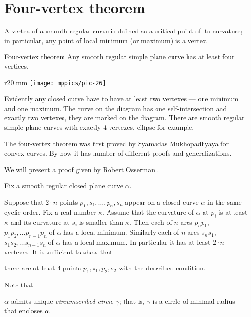 \chapter{Four-vertex theorem}

A vertex of a smooth regular curve is defined as a critical point of its curvature;
in particular, any point of local minimum (or maximum) is a vertex.

\begin{thm}{Four-vertex theorem}
Any smooth regular simple plane curve has at least four
vertices.
\end{thm}

\begin{wrapfigure}{r}{20 mm}
\vskip-4mm
\centering
\texttt{[image: mppics/pic-26]}
\vskip0mm
\end{wrapfigure}

Evidently any closed curve have to have at least two vertexes --- one minimum and one maximum.
The curve on the diagram has one self-intersection and exactly two vertexes, they are marked on the diagram.
There are smooth regular simple plane curves with exactly 4 vertexes, 
ellipse for example.

The four-vertex theorem was first proved by Syamadas Mukhopadhyaya \cite{mukhopadhyaya} for convex curves.
By now it has number of different proofs and generalizations.

We will present a proof given by Robert Osserman \cite{osserman}.

Fix a smooth regular closed plane curve $\alpha$.

Suppose that $2\cdot n$ points $p_1,s_1,\dots,p_n,s_n$ appear on a closed curve $\alpha$ in the same cyclic order.
Fix a real number $\kappa$.
Assume that the curvature of $\alpha$ at $p_i$ is at least $\kappa$ and its curvature at $s_i$ is smaller than $\kappa$.
Then each of $n$ arcs $p_{n}p_1$, $p_{1}p_2, \dots p_{n-1}p_n$ of
$\alpha$ has a local minimum.
Similarly each of $n$ arcs $s_{n}s_1$, $s_{1}s_2, \dots s_{n-1}s_n$ of
$\alpha$ has a local maximum.
In particular it has at least $2\cdot n$ vertexes.
It is sufficient to show that

\begin{clm}{}\label{clm-key}
there are at least 4 points $p_1,s_1,p_2,s_2$ with the described condition.
\end{clm}


Note that
\begin{clm}{}
$\alpha$
admits unique \emph{circumscribed circle} $\gamma$; that is, $\gamma$ is a circle of minimal radius that encloses $\alpha$.
\end{clm}

